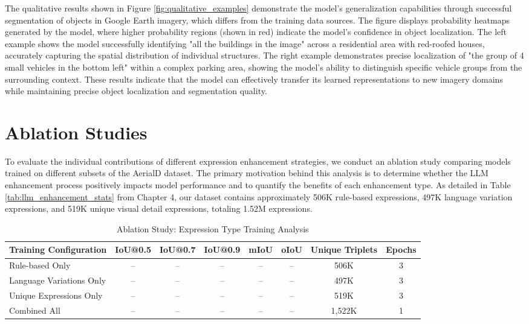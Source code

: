 The qualitative results shown in Figure \ref{fig:qualitative_examples} demonstrate the model's generalization capabilities through successful segmentation of objects in Google Earth imagery, which differs from the training data sources. The figure displays probability heatmaps generated by the model, where higher probability regions (shown in red) indicate the model's confidence in object localization. The left example shows the model successfully identifying "all the buildings in the image" across a residential area with red-roofed houses, accurately capturing the spatial distribution of individual structures. The right example demonstrates precise localization of "the group of 4 small vehicles in the bottom left" within a complex parking area, showing the model's ability to distinguish specific vehicle groups from the surrounding context. These results indicate that the model can effectively transfer its learned representations to new imagery domains while maintaining precise object localization and segmentation quality.

\section{Ablation Studies}

To evaluate the individual contributions of different expression enhancement strategies, we conduct an ablation study comparing models trained on different subsets of the AerialD dataset. The primary motivation behind this analysis is to determine whether the LLM enhancement process positively impacts model performance and to quantify the benefits of each enhancement type. As detailed in Table \ref{tab:llm_enhancement_stats} from Chapter 4, our dataset contains approximately 506K rule-based expressions, 497K language variation expressions, and 519K unique visual detail expressions, totaling 1.52M expressions.

\begin{table}[H]
\centering
\caption{Ablation Study: Expression Type Training Analysis}
\label{tab:ablation_expression_types}
{\footnotesize
\begin{tabular}{@{}p{3.2cm}ccccccc@{}}
\toprule
\textbf{Training Configuration} & \textbf{IoU@0.5} & \textbf{IoU@0.7} & \textbf{IoU@0.9} & \textbf{mIoU} & \textbf{oIoU} & \textbf{Unique Triplets} & \textbf{Epochs} \\
\midrule
Rule-based Only & -- & -- & -- & -- & -- & 506K & 3 \\
Language Variations Only & -- & -- & -- & -- & -- & 497K & 3 \\
Unique Expressions Only & -- & -- & -- & -- & -- & 519K & 3 \\
Combined All & -- & -- & -- & -- & -- & 1,522K & 1 \\
\bottomrule
\end{tabular}%
}
\end{table}

